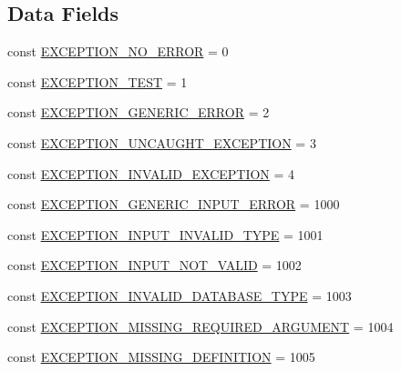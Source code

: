 \subsection*{Data Fields}
\begin{DoxyCompactItemize}
\item 
const \hyperlink{class_database_exception_model_a93f610f377641d6a80dc3ba2c0d282cd}{E\+X\+C\+E\+P\+T\+I\+O\+N\+\_\+\+N\+O\+\_\+\+E\+R\+R\+O\+R} = 0
\item 
const \hyperlink{class_database_exception_model_ad70fde01b9fdf6cab7de36cb7f2329dd}{E\+X\+C\+E\+P\+T\+I\+O\+N\+\_\+\+T\+E\+S\+T} = 1
\item 
const \hyperlink{class_database_exception_model_a1531374c43d8490500ae0220d0b4a45a}{E\+X\+C\+E\+P\+T\+I\+O\+N\+\_\+\+G\+E\+N\+E\+R\+I\+C\+\_\+\+E\+R\+R\+O\+R} = 2
\item 
const \hyperlink{class_database_exception_model_aa329d5b77c2ad7a40e283926c6c6dc2e}{E\+X\+C\+E\+P\+T\+I\+O\+N\+\_\+\+U\+N\+C\+A\+U\+G\+H\+T\+\_\+\+E\+X\+C\+E\+P\+T\+I\+O\+N} = 3
\item 
const \hyperlink{class_database_exception_model_a9214bdd72834d71914a74f0a27db4a1e}{E\+X\+C\+E\+P\+T\+I\+O\+N\+\_\+\+I\+N\+V\+A\+L\+I\+D\+\_\+\+E\+X\+C\+E\+P\+T\+I\+O\+N} = 4
\item 
const \hyperlink{class_database_exception_model_af16d7ab9f9f71d7ac961a10a2eb9ec65}{E\+X\+C\+E\+P\+T\+I\+O\+N\+\_\+\+G\+E\+N\+E\+R\+I\+C\+\_\+\+I\+N\+P\+U\+T\+\_\+\+E\+R\+R\+O\+R} = 1000
\item 
const \hyperlink{class_database_exception_model_ab85a8b8e512fdab1e0f3a0ca8be9aaa0}{E\+X\+C\+E\+P\+T\+I\+O\+N\+\_\+\+I\+N\+P\+U\+T\+\_\+\+I\+N\+V\+A\+L\+I\+D\+\_\+\+T\+Y\+P\+E} = 1001
\item 
const \hyperlink{class_database_exception_model_aecec182787a871e4c5c0a2f4110f9920}{E\+X\+C\+E\+P\+T\+I\+O\+N\+\_\+\+I\+N\+P\+U\+T\+\_\+\+N\+O\+T\+\_\+\+V\+A\+L\+I\+D} = 1002
\item 
const \hyperlink{class_database_exception_model_a5e32a0f3e8b89279262617564b4c39a2}{E\+X\+C\+E\+P\+T\+I\+O\+N\+\_\+\+I\+N\+V\+A\+L\+I\+D\+\_\+\+D\+A\+T\+A\+B\+A\+S\+E\+\_\+\+T\+Y\+P\+E} = 1003
\item 
const \hyperlink{class_database_exception_model_a95a9d1ff5c1d06fff7293ea4b61af959}{E\+X\+C\+E\+P\+T\+I\+O\+N\+\_\+\+M\+I\+S\+S\+I\+N\+G\+\_\+\+R\+E\+Q\+U\+I\+R\+E\+D\+\_\+\+A\+R\+G\+U\+M\+E\+N\+T} = 1004
\item 
const \hyperlink{class_database_exception_model_acb77d344642fcd23d3007350580df264}{E\+X\+C\+E\+P\+T\+I\+O\+N\+\_\+\+M\+I\+S\+S\+I\+N\+G\+\_\+\+D\+E\+F\+I\+N\+I\+T\+I\+O\+N} = 1005

\end{DoxyCompactItemize}
